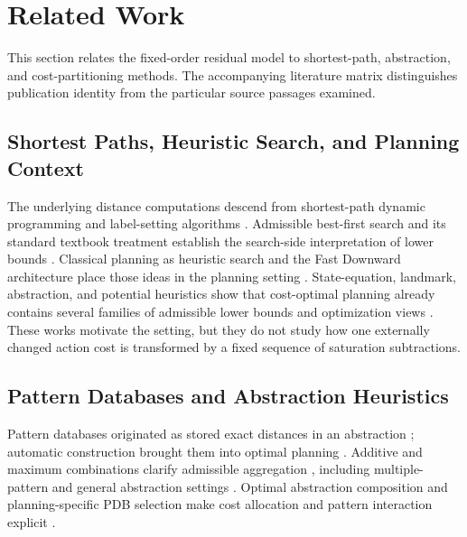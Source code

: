 \section{Related Work}

This section relates the fixed-order residual model to shortest-path, abstraction, and cost-partitioning methods. The accompanying literature matrix distinguishes publication identity from the particular source passages examined.

\subsection{Shortest Paths, Heuristic Search, and Planning Context}
The underlying distance computations descend from shortest-path dynamic programming and label-setting algorithms \citep{bellman1958,dijkstra1959}. Admissible best-first search and its standard textbook treatment establish the search-side interpretation of lower bounds \citep{hart1968,pearl1984}. Classical planning as heuristic search and the Fast Downward architecture place those ideas in the planning setting \citep{bonetgeffner2001,helmert2006}. State-equation, landmark, abstraction, and potential heuristics show that cost-optimal planning already contains several families of admissible lower bounds and optimization views \citep{bonet2013,karpasdomshlak2009,helmertdomshlak2009,seipppommerening2015}. These works motivate the setting, but they do not study how one externally changed action cost is transformed by a fixed sequence of saturation subtractions.

\subsection{Pattern Databases and Abstraction Heuristics}
Pattern databases originated as stored exact distances in an abstraction \citep{culberson1998,korf1997}; automatic construction brought them into optimal planning \citep{edelkamp2001,edelkamp2006}. Additive and maximum combinations clarify admissible aggregation \citep{felner2004,holte2006}, including multiple-pattern and general abstraction settings \citep{haslum2007,yang2008}. Optimal abstraction composition and planning-specific PDB selection make cost allocation and pattern interaction explicit \citep{katzdomshlak2008,pommerening2013}.

